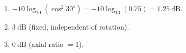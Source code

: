 \begin{enumerate}[leftmargin=1.6em,itemsep=2pt]
\item $-10\log_{10}(\cos^2 30^{\circ}) = -10\log_{10}(0.75) = 1.25\ \text{dB}$.
\item $3\ \text{dB}$ (fixed, independent of rotation).
\item $0\ \text{dB}$ (axial ratio $= 1$).
\end{enumerate}
